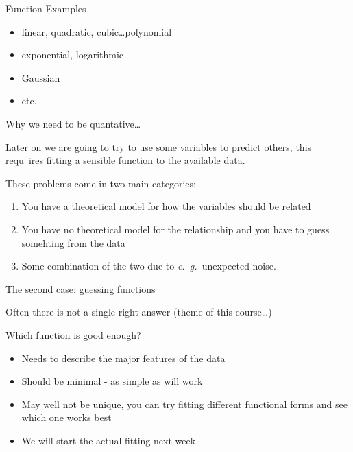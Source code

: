 \documentclass{beamer}
\begin{document}
\begin{frame}{Function Examples}


\begin{itemize}
\item linear, quadratic, cubic\ldots polynomial
\item exponential, logarithmic
\item Gaussian
\item etc.
\end{itemize}


\end{frame}


\begin{frame}{Why we need to be quantative\ldots}

Later on we are going to try to use some variables to predict others, this requ\
ires fitting a sensible function to the available data.

\vspace{5mm}

These problems come in two main categories:
\begin{enumerate}
\item You have a theoretical model for how the variables should be related
\item You have no theoretical model for the relationship and you have to guess somehting from the data
\item Some combination of the two due to \textit{e.~g.~}unexpected noise.
\end{enumerate}

\end{frame}




\begin{frame}{The second case: guessing functions}

Often there is not a single right answer (theme of this course\ldots)

\vspace{5mm}

Which function is good enough?
\begin{itemize}
\item Needs to describe the major features of the data
\item Should be minimal - as simple as will work
\item May well not be unique, you can try fitting different functional forms and see which one works best
\item We will start the actual fitting next week
\end{itemize}


\end{frame}
\end{document}
